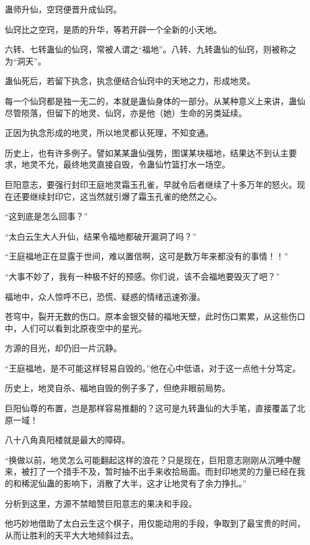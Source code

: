 
\begin{this_body}

蛊师升仙，空窍便晋升成仙窍。

仙窍比之空窍，是质的升华，等若开辟一个全新的小天地。

六转、七转蛊仙的仙窍，常被人谓之“福地”。八转、九转蛊仙的仙窍，则被称之为“洞天”。

蛊仙死后，若留下执念，执念便结合仙窍中的天地之力，形成地灵。

每一个仙窍都是独一无二的，本就是蛊仙身体的一部分。从某种意义上来讲，蛊仙尽管陨落，但留下的地灵、仙窍，亦是他（她）生命的另类延续。

正因为执念形成的地灵，所以地灵都认死理，不知变通。

历史上，也有许多例子。譬如某某蛊仙强势，图谋某块福地，结果达不到认主要求，地灵不允，最终地灵直接自毁，令蛊仙竹篮打水一场空。

巨阳意志，要强行封印王庭地灵霜玉孔雀，早就令后者继续了十多万年的怒火。现在还要继续封印它，这当然就引爆了霜玉孔雀的绝然之心。

“这到底是怎么回事？”

“太白云生大人升仙，结果令福地都破开漏洞了吗？”

“王庭福地正在显露于世间，难以置信啊，这可是数万年来都没有的事情！！”

“大事不妙了，我有一种极不好的预感。你们说，该不会福地要毁灭了吧？”

福地中，众人惊呼不已，恐慌、疑惑的情绪迅速弥漫。

苍穹中，裂开无数的伤口。原本金银交替的福地天壁，此时伤口累累，从这些伤口中，人们可以看到北原夜空中的星光。

方源的目光，却仍旧一片沉静。

“王庭福地，是不可能这样轻易自毁的。”他在心中低语，对于这一点他十分笃定。

历史上，地灵自杀、福地自毁的例子多了，但绝非眼前局势。

巨阳仙尊的布置，岂是那样容易推翻的？这可是九转蛊仙的大手笔，直接覆盖了北原一域！

八十八角真阳楼就是最大的障碍。

“换做以前，地灵怎么可能翻起这样的浪花？只是现在，巨阳意志刚刚从沉睡中醒来，被打了一个措手不及，暂时抽不出手来收拾局面。而封印地灵的力量已经在我的和稀泥仙蛊的影响下，消散了大半，这才让地灵有了余力挣扎。”

分析到这里，方源不禁暗赞巨阳意志的果决和手段。

他巧妙地借助了太白云生这个棋子，用仅能动用的手段，争取到了最宝贵的时间，从而让胜利的天平大大地倾斜过去。


\end{this_body}
